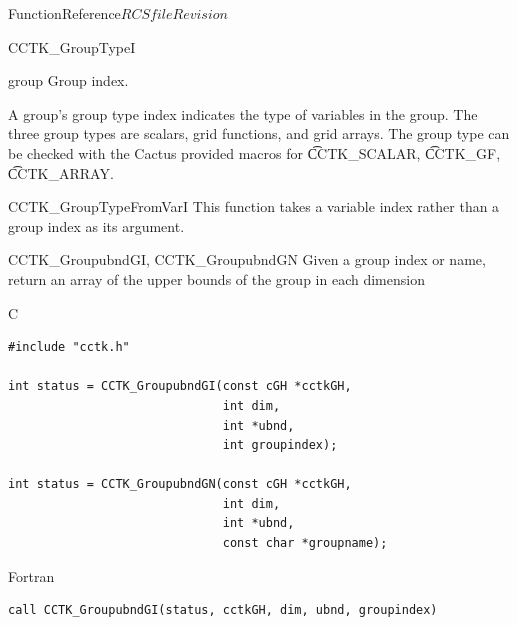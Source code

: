 \begin{cactuspart}{FunctionReference}{$RCSfile$}{$Revision$}
\begin{FunctionDescription}{CCTK\_GroupTypeI}{}
\begin{ParameterSection}
\begin{Parameter}{group}
Group index.
\end{Parameter}
\end{ParameterSection}

\begin{Discussion}
A group's group type index indicates the type of variables in the
group.  The three group types are scalars, grid functions, and grid
arrays. The group type can be checked with the Cactus provided macros
for {\t CCTK\_SCALAR}, {\t CCTK\_GF}, {\t CCTK\_ARRAY}.
\end{Discussion}

\begin{SeeAlsoSection}
\begin{SeeAlso}{CCTK\_GroupTypeFromVarI}
This function takes a variable index rather than a group index as its argument.
\end{SeeAlso}
\end{SeeAlsoSection}
\end{FunctionDescription}


\begin{FunctionDescription}{CCTK\_GroupubndGI, CCTK\_GroupubndGN}
\label{CCTK-GroupubndGI}
\label{CCTK-GroupubndGN}
Given a group index or name, return an array of the upper bounds of the group in each dimension

\begin{SynopsisSection}
\begin{Synopsis}{C}
\begin{verbatim}
#include "cctk.h"

int status = CCTK_GroupubndGI(const cGH *cctkGH,
                              int dim,
                              int *ubnd,
                              int groupindex);

int status = CCTK_GroupubndGN(const cGH *cctkGH,
                              int dim,
                              int *ubnd,
                              const char *groupname);
\end{verbatim}
\end{Synopsis}
\begin{Synopsis}{Fortran}
\begin{verbatim}
call CCTK_GroupubndGI(status, cctkGH, dim, ubnd, groupindex)


\end{verbatim}
\end{Synopsis}
\end{SynopsisSection}
\end{FunctionDescription}
\end{cactuspart}
